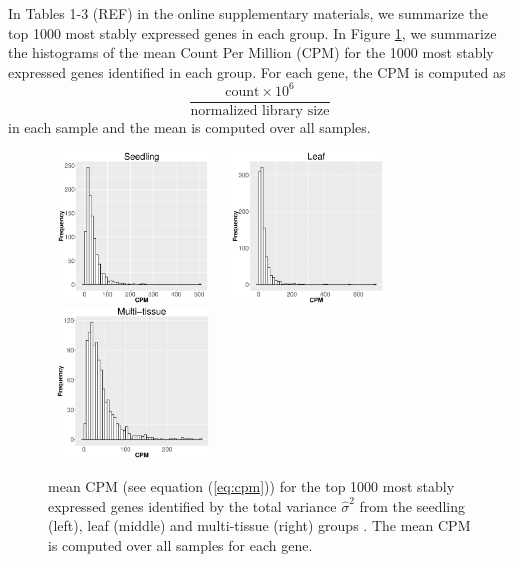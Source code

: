 \documentclass[letterpaper,12pt]{article}
\begin{document}
In Tables 1-3 (REF) in the online supplementary materials, we summarize the
top 1000 most stably expressed genes in each group.  In Figure \ref{cpm}, we
summarize the histograms of the mean Count Per Million (CPM) for the 1000
most stably expressed genes identified in each group. For each gene, the CPM
is computed as
\begin{equation}\label{eq:cpm}
 \dfrac{ \text{count} \times 10^6 }{ \text{normalized library size}} 
\end{equation}
in each sample and the mean is computed over all samples.
 
\begin{figure}[] \begin{center}
    \includegraphics[width=4.5cm,height=4cm]{Figures/cpm_seedling.eps}
    \includegraphics[width=4.5cm,height=4cm]{Figures/cpm_leaves.eps}
    \includegraphics[width=4.5cm,height=4cm]{Figures/cpm_tissue.eps}
    \caption{{\small{\label{cpm} mean CPM (see equation (\ref{eq:cpm})) for the top 1000 most stably expressed genes identified by the total variance $\hat{\sigma}^2$} from the seedling (left), leaf (middle) and multi-tissue
    (right) groups }. The mean CPM is computed over all samples for each gene.} \end{center} 
\end{figure} 
\end{document}

